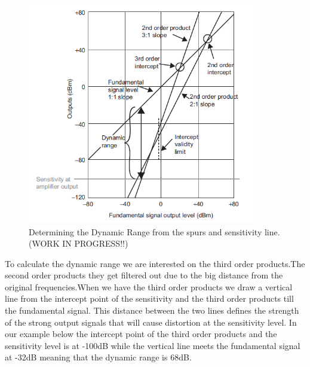 \begin{figure}[H]
\centering
\includegraphics[width=0.90\textwidth]{figures/Dynamic_range_calc.png}
\caption{Determining the Dynamic Range from the spurs and sensitivity line.(WORK IN PROGRESS!!)}
\label{Dynamic_range_calc}
\end{figure}
To calculate the dynamic range we are interested on the third order products.The second order products they get filtered out due to the big distance from the original frequencies.When we have the third order products we draw a vertical line from the intercept point of the sensitivity and the third order products till the fundamental signal. This distance between the two lines defines the strength of the strong output signals that will cause distortion at the sensitivity level. In our example below the intercept point of the third order products and the sensitivity level is at -100dB while the vertical line meets the fundamental signal at -32dB meaning that the dynamic range is 68dB. 




